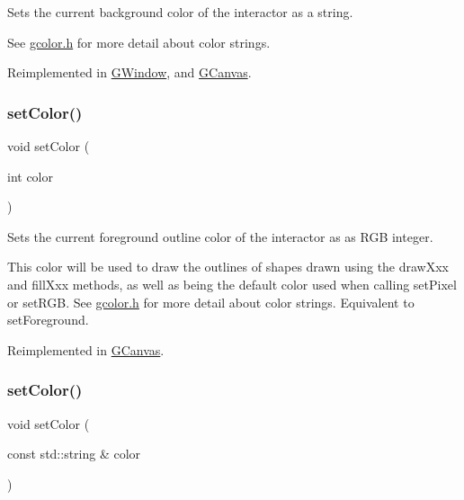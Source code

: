 Sets the current background color of the interactor as a string. 

See \mbox{\hyperlink{gcolor_8h_source}{gcolor.\+h}} for more detail about color strings. 

Reimplemented in \mbox{\hyperlink{classGWindow_a9cb99695b93494c7ba28268ce9e42c2a}{G\+Window}}, and \mbox{\hyperlink{classGCanvas_a9cb99695b93494c7ba28268ce9e42c2a}{G\+Canvas}}.

\mbox{\label{classGDrawingSurface_a75b9cb32ff80bf061791beb01a8433d0}} 
\subsubsection{\texorpdfstring{set\+Color()}{setColor()}\hspace{0.1cm}{\footnotesize\ttfamily [1/2]}}
{\footnotesize\ttfamily void set\+Color (\begin{DoxyParamCaption}\item[{int}]{color }\end{DoxyParamCaption})\hspace{0.3cm}{\ttfamily [virtual]}}



Sets the current foreground outline color of the interactor as as R\+GB integer. 

This color will be used to draw the outlines of shapes drawn using the draw\+Xxx and fill\+Xxx methods, as well as being the default color used when calling set\+Pixel or set\+R\+GB. See \mbox{\hyperlink{gcolor_8h_source}{gcolor.\+h}} for more detail about color strings. Equivalent to set\+Foreground. 

Reimplemented in \mbox{\hyperlink{classGCanvas_af6e1bcf23a09a0ae0607daff81ee45fa}{G\+Canvas}}.

\mbox{\label{classGDrawingSurface_a61374df6c11b52cfbb0815decdbaebc6}} 
\subsubsection{\texorpdfstring{set\+Color()}{setColor()}\hspace{0.1cm}{\footnotesize\ttfamily [2/2]}}
{\footnotesize\ttfamily void set\+Color (\begin{DoxyParamCaption}\item[{const std\+::string \&}]{color }\end{DoxyParamCaption})\hspace{0.3cm}{\ttfamily [virtual]}}



